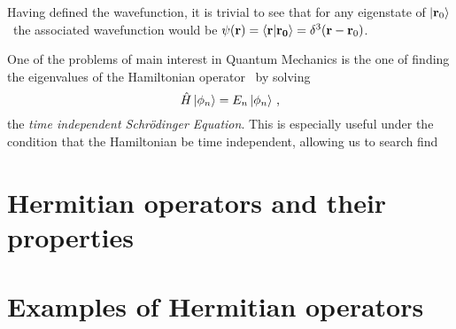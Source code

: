         
        
        Having defined the wavefunction, it is trivial to see that for any eigenstate of $\ket{\vb{r}_0}$ \hvr\ the associated wavefunction would be $\psi\pqty{\vb{r}} = \braket{\vb{r}}{\vb{r_0}} = \delta^3\pqty{\vb{r} - \vb{r}_0}$.

        One of the problems of main interest in Quantum Mechanics is the one of finding the eigenvalues of the Hamiltonian operator \hH\ by solving 
        \begin{equation}
            \hat{H}\ket{\phi_n} = E_n\ket{\phi_n}
            \,\text{,}
        \end{equation}
        the \emph{time independent Schr\"odinger Equation}.
        This is especially useful under the condition that the Hamiltonian be time independent, allowing us to search find 
    \section{Hermitian operators and their properties}
    \section{Examples of Hermitian operators}
